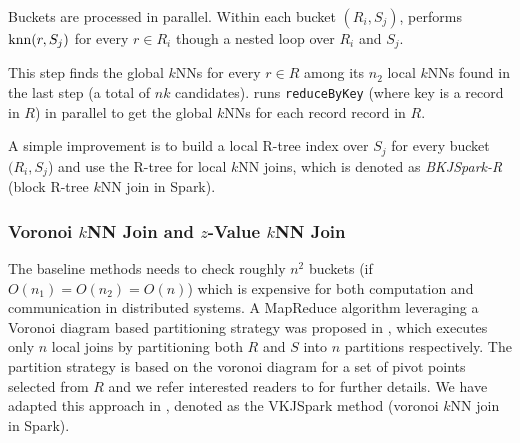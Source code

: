  Buckets are processed in
parallel. Within each bucket $(R_i, S_j)$, \name performs
$\operatorname{knn}(r, S_j)$ for every $r\in R_i$ though a nested loop over $R_i$
and $S_j$. %

 This step finds the global $k$NNs for every
$r \in R$ among its $n_2$ local $k$NNs found in the last step (a total
of $nk$ candidates). \name runs \texttt{reduceByKey} (where key is a
record in $R$) in parallel to get the global $k$NNs for each record
record in $R$.

A simple improvement is to build a local R-tree index over $S_j$ for
every bucket $(R_i, S_j$) and use the R-tree for local $k$NN joins,
which is denoted as \emph{BKJSpark-R} (block R-tree $k$NN join in Spark).


\subsubsection{Voronoi $k$NN Join and $z$-Value $k$NN Join}
\label{subsub:voronoi}
The baseline methods needs to check roughly $n^2$ buckets (if
$O(n_1)=O(n_2)=O(n)$) which is expensive for both computation and
communication in distributed systems. A MapReduce algorithm leveraging
a Voronoi diagram based partitioning strategy was proposed in
\cite{bcknnj}, which executes only $n$ local joins by partitioning
both $R$ and $S$ into $n$ partitions respectively. The partition
strategy is based on the voronoi diagram for a set of pivot points
selected from $R$ and we refer interested readers to \cite{bcknnj} for
further details. We have adapted this approach in \name, denoted as
the VKJSpark method (voronoi $k$NN join in Spark).


